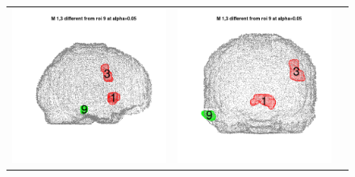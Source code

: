 \documentclass[12pt]{article}
\begin{document}
\begin{figure}[h]
\begin{tabular}{ccc}
\includegraphics[scale = 0.24]{../a7plots/d_3r_9_view1.png} & 
\includegraphics[scale = 0.24]{../a7plots/d_3r_9_view2.png} & 

\end{tabular}
\end{figure}
\end{document}
